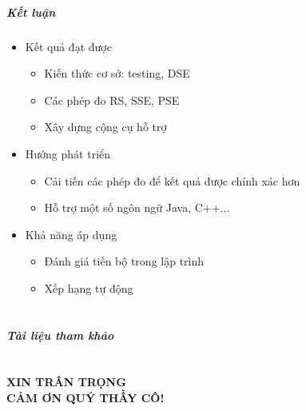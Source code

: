 \documentclass{beamer}
\begin{document}
\begin{frame}
  \frametitle{Kết luận}
	
  \begin{itemize}
  	\item Kết quả đạt được 
  	\begin{itemize}
  		\item Kiến thức cơ sở: testing, DSE
  		\item Các phép đo RS, SSE, PSE
  		\item Xây dựng cộng cụ hỗ trợ
  	\end{itemize} \pause
  	\item Hướng phát triển
  	\begin{itemize}
  		\item Cải tiến các phép đo để kết quả được chính xác hơn
  		\item Hỗ trợ một số ngôn ngữ Java, C++...
  	\end{itemize} \pause
  	\item Khả năng áp dụng
  	\begin{itemize}
  		\item Đánh giá tiến bộ trong lập trình
  		\item Xếp hạng tự động
  	\end{itemize}
  \end{itemize}
\end{frame}


\part{}

\begin{frame}
  \frametitle{Tài liệu tham khảo}
  
  {\footnotesize}
\end{frame}

\part{}
\begin{frame}
  \begin{center}
    \begin{Huge}
      \textcolor{BlueGreen}{\textbf{XIN TRÂN TRỌNG \\ CẢM ƠN QUÝ THẦY CÔ!}}
    \end{Huge}
\end{center}

\end{frame}

\end{document}
